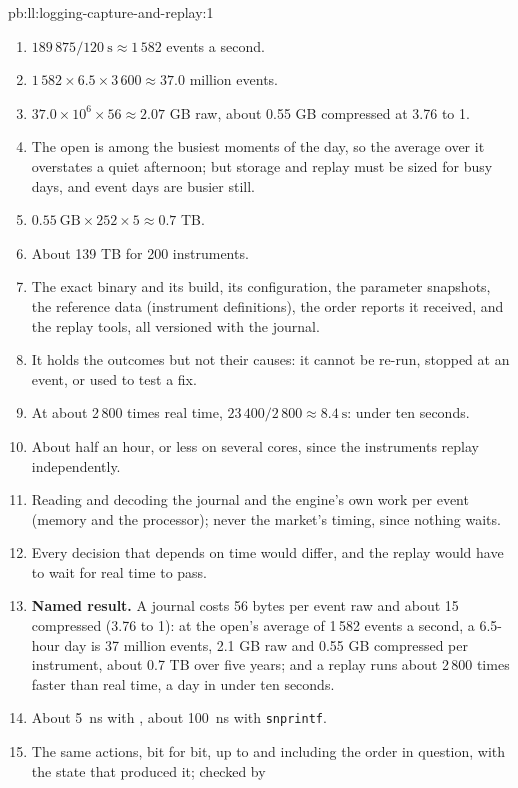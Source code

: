 \begin{solution}{pb:ll:logging-capture-and-replay:1}
\begin{enumerate}
\item $189\,875 / \qty{120}{\second} \approx 1\,582$ events a second.
\item $1\,582 \times 6.5 \times 3\,600 \approx 37.0$ million events.
\item $37.0 \times 10^6 \times 56 \approx 2.07$ GB raw, about 0.55 GB compressed at 3.76 to 1.
\item The open is among the busiest moments of the day, so the average over it overstates a quiet afternoon; but storage and
replay must be sized for busy days, and event days are busier still.
\item $0.55~\text{GB} \times 252 \times 5 \approx 0.7$ TB.
\item About 139 TB for 200 instruments.
\item The exact binary and its build, its configuration, the parameter snapshots, the reference data (instrument definitions),
the order reports it received, and the replay tools, all versioned with the journal.
\item It holds the outcomes but not their causes: it cannot be re-run, stopped at an event, or used to test a fix.
\item At about 2\,800 times real time, $23\,400 / 2\,800 \approx \qty{8.4}{\second}$: under ten seconds.
\item About half an hour, or less on several cores, since the instruments replay independently.
\item Reading and decoding the journal and the engine's own work per event (memory and the processor); never the market's
timing, since nothing waits.
\item Every decision that depends on time would differ, and the replay would have to wait for real time to pass.
\item \textbf{Named result.} A journal costs 56 bytes per event raw and about 15 compressed (3.76 to 1): at the open's
average of 1\,582 events a second, a 6.5-hour day is 37 million events, 2.1 GB raw and 0.55 GB compressed per instrument, about
0.7 TB over five years; and a replay runs about 2\,800 times faster than real time, a day in under ten seconds.
\item About \qty{5}{\nano\second} with , about \qty{100}{\nano\second} with \texttt{snprintf}.
\item The same actions, bit for bit, up to and including the order in question, with the state that produced it; checked by

\end{enumerate}
\end{solution}
